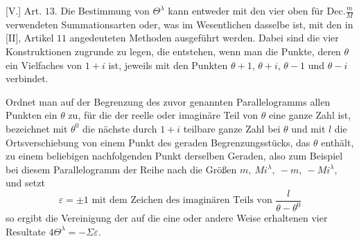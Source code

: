 [V.] Art. $13$. Die Bestimmung von $\Theta^\lambda$ kann entweder mit den vier oben für $\mathrm{Dec.}\frac mM$ verwendeten Summationsarten oder, was im Wesentlichen dasselbe ist, mit den in [II], Artikel $11$ angedeuteten Methoden ausgeführt werden. Dabei sind die vier Konstruktionen zugrunde zu legen, die entstehen, wenn man die Punkte, deren $\theta$ ein Vielfaches von $1+i$ ist, jeweils mit den Punkten $\theta+1$, $\theta+i$, $\theta-1$ und $\theta-i$ verbindet.

Ordnet man auf der Begrenzung des zuvor genannten Parallelogramms allen Punkten ein $\theta$ zu, für die der reelle oder imaginäre Teil von $\theta$ eine ganze Zahl ist, bezeichnet mit $\theta^0$ die nächste durch $1+i$ teilbare ganze Zahl bei $\theta$ und mit $l$ die Ortsverschiebung von einem Punkt des geraden Begrenzungsstücks, das $\theta$ enthält, zu einem beliebigen nachfolgenden Punkt derselben Geraden, also zum Beispiel bei diesem Parallelogramm der Reihe nach die Größen $m,\ Mi^\lambda,\ -m,\ -Mi^\lambda$, und setzt
\[
\varepsilon=\pm1\text{ mit dem Zeichen des imaginären Teils von }\frac l{\theta-\theta^0}
\]
so ergibt die Vereinigung der auf die eine oder andere Weise erhaltenen vier Resultate $4\Theta^\lambda=-\Sigma\varepsilon$.

